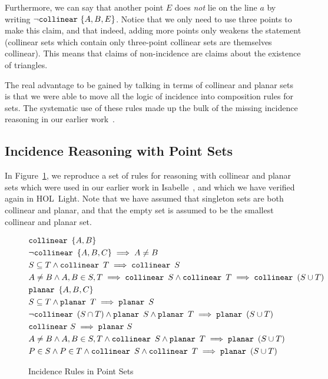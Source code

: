 Furthermore, we can say that another point $E$ does \emph{not} lie on the line $a$ by writing $\neg \texttt{collinear}\ \{A, B, E\}$. Notice that we only need to use three points to make this claim, and that indeed, adding more points only weakens the statement (collinear sets which contain only three-point collinear sets are themselves collinear). This means that claims of non-incidence are claims about the existence of triangles.

The real advantage to be gained by talking in terms of collinear and planar sets is that we were able to move all the logic of incidence into composition rules for sets. The systematic use of these rules made up the bulk of the missing incidence reasoning in our earlier work~\cite{ScottMScThesis}.

\subsection{Incidence Reasoning with Point Sets}\label{sec:PointSets}
In Figure~\ref{fig:PointSets}, we reproduce a set of rules for reasoning with collinear and planar sets which were used in our earlier work in Isabelle~\cite{ScottMScThesis}, and which we have verified again in HOL~Light. Note that we have assumed that singleton sets are both collinear and planar, and that the empty set is assumed to be the smallest collinear and planar set. 

\begin{figure}
\begin{align}
&\texttt{collinear}\ \, \{A,B\} \label{rule:colltwo}\\
&\neg \texttt{collinear}\ \, \{A,B,C\} \implies A \neq B
  \label{rule:noncollneq}\\
&S \subseteq T \wedge \texttt{collinear}\ \, T \implies \texttt{collinear}\ \, S
  \label{rule:collsubset}\\
&A \neq B \wedge A,B \in S,T \implies \texttt{collinear}\ \, S \wedge \texttt{collinear}\ \, T \implies \texttt{collinear}\ \, (S \cup T) \label{rule:collunion}\\
&\texttt{planar}\ \, \{A,B,C\} \label{rule:planethree}\\
&S \subseteq T \wedge \texttt{planar}\ \, T \implies \texttt{planar}\ \, S
  \label{rule:planesubset}\\
&\neg\texttt{collinear}\ \, (S \cap T) \wedge \texttt{planar}\ \, S \wedge \texttt{planar}\ \, T \implies \texttt{planar}\ \, (S \cup T) \label{rule:planeunion}\\
&\texttt{collinear}\  S \implies \texttt{planar}\  S \label{rule:collplane}\\
&A \neq B \wedge A,B \in S,T \wedge \texttt{collinear}\ \, S \wedge \texttt{planar}\ \, T \implies \texttt{planar}\ \, (S \cup T) \label{rule:collplaneplane}\\
&P \in S \wedge P \in T \wedge \texttt{collinear}\ \, S \wedge \texttt{collinear}\ \, T \implies \texttt{planar}\ \, (S \cup T) \label{rule:collcollplane}
\end{align}
\caption{Incidence Rules in Point Sets}\label{fig:PointSets}
\end{figure}


